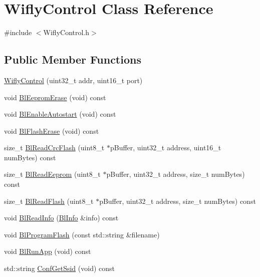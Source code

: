 \hypertarget{class_wifly_control}{\section{Wifly\-Control Class Reference}
\label{class_wifly_control}
}


{\ttfamily \#include $<$Wifly\-Control.\-h$>$}

\subsection*{Public Member Functions}
\begin{DoxyCompactItemize}
\item 
\hyperlink{class_wifly_control_a23f04e8c95cf5ebd5d576c0f6c5fecff}{Wifly\-Control} (uint32\-\_\-t addr, uint16\-\_\-t port)
\item 
void \hyperlink{class_wifly_control_a96bd445dcfcb45252530315b8919fd80}{Bl\-Eeprom\-Erase} (void) const 
\item 
void \hyperlink{class_wifly_control_acc372e780a40e0634d1ccf89aaba6b32}{Bl\-Enable\-Autostart} (void) const 
\item 
void \hyperlink{class_wifly_control_abe0bceb7ec0cfc88c2fccdae0d844d8a}{Bl\-Flash\-Erase} (void) const 
\item 
size\-\_\-t \hyperlink{class_wifly_control_a97f0c9d5e0ea08f2f60a720b0134fff1}{Bl\-Read\-Crc\-Flash} (uint8\-\_\-t $\ast$p\-Buffer, uint32\-\_\-t address, uint16\-\_\-t num\-Bytes) const 
\item 
size\-\_\-t \hyperlink{class_wifly_control_a13504dcf2d451545e8b5c3fa2f85b0e4}{Bl\-Read\-Eeprom} (uint8\-\_\-t $\ast$p\-Buffer, uint32\-\_\-t address, size\-\_\-t num\-Bytes) const 
\item 
size\-\_\-t \hyperlink{class_wifly_control_a5337818ba998047b8a8cdc738ddf3e43}{Bl\-Read\-Flash} (uint8\-\_\-t $\ast$p\-Buffer, uint32\-\_\-t address, size\-\_\-t num\-Bytes) const 
\item 
void \hyperlink{class_wifly_control_a26885cabebc9719b1da2d29131517efb}{Bl\-Read\-Info} (\hyperlink{struct_bl_info}{Bl\-Info} \&info) const 
\item 
void \hyperlink{class_wifly_control_a29e6124445a27e1fd26cfccce701cc09}{Bl\-Program\-Flash} (const std\-::string \&filename)
\item 
void \hyperlink{class_wifly_control_a776073bd4991e4331fb946e456d803df}{Bl\-Run\-App} (void) const 
\item 
std\-::string \hyperlink{class_wifly_control_aa46eb435216680bdb7e069571e7f7545}{Conf\-Get\-Ssid} (void) const 

\end{DoxyCompactItemize}
